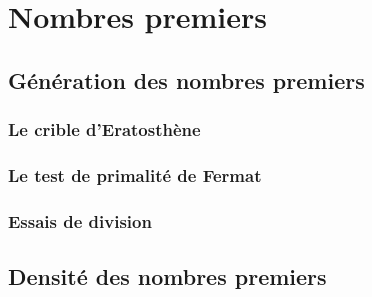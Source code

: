 \chapter{Nombres premiers}
	\section{Génération des nombres premiers}
		\subsection{Le crible d'Eratosthène}
		\subsection{Le test de primalité de Fermat}
		\subsection{Essais de division}
	\section{Densité des nombres premiers}